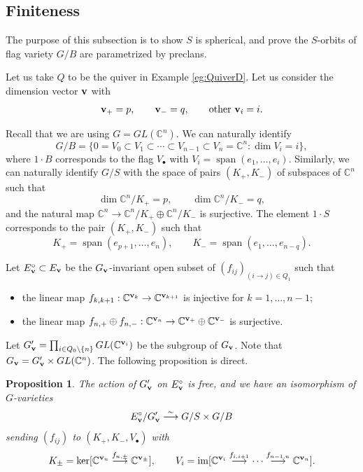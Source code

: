 \documentclass[12pt,reqno]{amsart}
\numberwithin{equation}{section}
\newtheorem{prop}[theorem]{Proposition}
\theoremstyle{definition}
\begin{document}
\subsection{Finiteness}\label{sec:finiteofS}
The purpose of this subsection is to show $S$ is spherical, and prove the $S$-orbits of flag variety $G/B$ are parametrized by preclans. 

Let us take $Q$ to be the quiver in Example \ref{eg:QuiverD}. 
Let us consider the dimension vector $\mathbf{v}$ with 
$$\mathbf{v}_+=p,\qquad \mathbf{v}_-=q,\qquad\text{other }\mathbf{v}_i=i.$$


Recall that we are using $G=GL(\mathbb{C}^n)$. 
We can naturally identify
$$G/B=\{0=V_0\subset V_1\subset \cdots \subset V_{n-1}\subset V_n=\mathbb{C}^n:\dim V_i=i\},$$
where $1\cdot B$ corresponds to the flag $V_\bullet$ with $V_i=\operatorname{span}(e_1,\ldots,e_i)$. 
Similarly, we can naturally identify $G/S$ with the space of pairs $(K_+,K_-)$ of subspaces of $\mathbb{C}^n$ such that  
$$\dim \mathbb{C}^n/K_+=p,\qquad 
\dim \mathbb{C}^n/K_-=q,$$
and the natural map $\mathbb{C}^n\to \mathbb{C}^n/K_+\oplus \mathbb{C}^n/K_-$ is surjective. 
The element $1\cdot S$ corresponds to the pair $(K_+,K_-)$ such that 
\begin{equation}\label{eq:stdKpm}
K_+=\operatorname{span}(e_{p+1},\ldots,e_{n}),\qquad 
K_-=\operatorname{span}(e_{1},\ldots,e_{n-q}).
\end{equation}


Let $E_{\mathbf{v}}^\circ\subset E_{\mathbf{v}}$ be the $G_{\mathbf{v}}$-invariant open subset of $(f_{ij})_{(i\to j)\in Q_1}$ such that 
\begin{itemize}
    \item the linear map 
    $f_{k,k+1}:\mathbb{C}^{\mathbf{v}_k}\to \mathbb{C}^{\mathbf{v}_{k+1}}$ is injective for $k=1,\ldots,n-1$; 
    \item the linear map 
    $f_{n,+}\oplus f_{n,-}:\mathbb{C}^{\mathbf{v}_n}\to \mathbb{C}^{\mathbf{v}_+}\oplus \mathbb{C}^{\mathbf{v}_-}$ is surjective.
\end{itemize} 
Let 
$G_{\mathbf{v}}'=\prod_{i\in Q_0\setminus \{n\}}GL(\mathbb{C}^{\mathbf{v}_i})$ be the subgroup of $G_{\mathbf{v}}$. 
Note that $G_{\mathbf{v}}=G_{\mathbf{v}}'\times GL(\mathbb{C}^n)$. 
The following proposition is direct. 

\begin{prop}\label{prop:identifyG/S}
The action of $G_{\mathbf{v}}'$ on $E_{\mathbf{v}}^\circ$ is free, and we have an isomorphism of $G$-varieties
$$E_{\mathbf{v}}^\circ/G_{\mathbf{v}}'\stackrel{\sim}\longrightarrow G/S\times G/B$$
sending $(f_{ij})$ to $(K_+,K_-,V_\bullet)$ with 
$$K_\pm=\ker[\mathbb{C}^{\mathbf{v}_n}
\stackrel{f_{n,\pm}}\longrightarrow \mathbb{C}^{\mathbf{v}_\pm}],\qquad 
V_i=\operatorname{im}[
\mathbb{C}^{\mathbf{v}_i}
\stackrel{f_{i,i+1}}\longrightarrow
\cdots 
\stackrel{f_{n-1,n}}\longrightarrow
\mathbb{C}^{\mathbf{v}_{n}}].$$
\end{prop}
\end{document}
